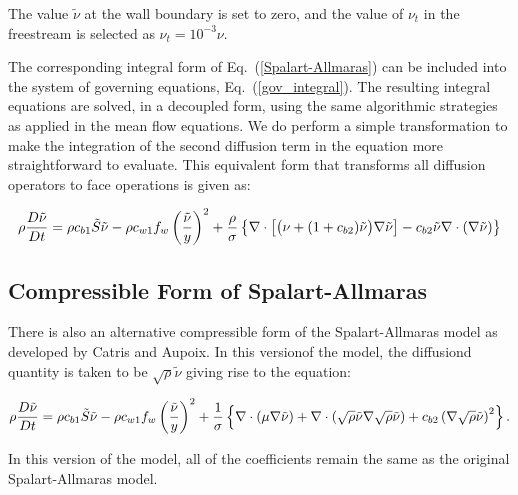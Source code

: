 The value ${\tilde{\nu}}$ at the wall boundary is set to zero,
and the value of $\nu_t$ in the freestream is selected as $\nu_t=10^{-3}\nu$.
 
The corresponding integral form of Eq.~(\ref{Spalart-Allmaras}) can be
included into the system of governing equations,
Eq.~(\ref{gov_integral}).  The resulting integral equations are
solved, in a decoupled form, using the same algorithmic strategies as
applied in the mean flow equations.  We do perform a simple
transformation to make the integration of the second diffusion term in
the equation more straightforward to evaluate.  This equivalent form that transforms all diffusion operators to face operations is given as:

\begin{equation}
\rho \frac{D\tilde{\nu}}{D t} =  \rho c_{b1}\Tilde{S}\tilde{\nu} 
- \rho c_{w1} f_w \left ( \frac{\tilde{\nu}}{y} \right )^2 +
\frac{\rho}{\sigma} \left \{ \nabla \cdot \left[\bigl( \nu + (1+c_{b2}) \tilde{\nu}\bigr) \nabla \tilde{\nu}\right] - c_{b2} \tilde{\nu} \nabla \cdot (\nabla \tilde{\nu})\right\}
\end{equation}

\subsection{Compressible Form of Spalart-Allmaras}

There is also an alternative compressible form of the Spalart-Allmaras model as developed by Catris and Aupoix.  In this versionof the model, the diffusiond quantity is taken to be $\sqrt{\rho} \tilde{\nu}$ giving rise to the equation:

\begin{equation}
\rho \frac{D \tilde{\nu}} {D t} = \rho c_{b1}\Tilde{S}\tilde{\nu} 
- \rho c_{w1} f_w \left ( \frac{\tilde{\nu}}{y} \right )^2 +
\frac{1}{\sigma} \left\{ \nabla \cdot (\mu \nabla \tilde{\nu}) + \nabla\cdot \left( \sqrt{\rho}\tilde{\nu} \nabla \sqrt{\rho}\tilde{\nu}\right) + c_{b2} \left(\nabla \sqrt{\rho}\tilde{\nu}\right)^2\right\}.
\end{equation}

In this version of the model, all of the coefficients remain the same as the original Spalart-Allmaras model.
